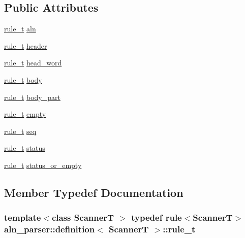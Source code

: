 \subsection*{Public Attributes}
\begin{DoxyCompactItemize}
\item 
\hyperlink{structaln__parser_1_1definition_a03794636bf4d0d047278756431378b21}{rule\+\_\+t} \hyperlink{structaln__parser_1_1definition_ab6919ea9346e2e607e34318f25211534}{aln}
\item 
\hyperlink{structaln__parser_1_1definition_a03794636bf4d0d047278756431378b21}{rule\+\_\+t} \hyperlink{structaln__parser_1_1definition_a7c56859f82c03b3f85d16095aea09f65}{header}
\item 
\hyperlink{structaln__parser_1_1definition_a03794636bf4d0d047278756431378b21}{rule\+\_\+t} \hyperlink{structaln__parser_1_1definition_a4ae49d8047c2156cbf75510ef5f3b434}{head\+\_\+word}
\item 
\hyperlink{structaln__parser_1_1definition_a03794636bf4d0d047278756431378b21}{rule\+\_\+t} \hyperlink{structaln__parser_1_1definition_ae6705116cb940909cda17ea3849c062f}{body}
\item 
\hyperlink{structaln__parser_1_1definition_a03794636bf4d0d047278756431378b21}{rule\+\_\+t} \hyperlink{structaln__parser_1_1definition_a64e55f65312e9ed84df5249ea54d45ea}{body\+\_\+part}
\item 
\hyperlink{structaln__parser_1_1definition_a03794636bf4d0d047278756431378b21}{rule\+\_\+t} \hyperlink{structaln__parser_1_1definition_afafdb23081539c09e9e4912b558d8332}{empty}
\item 
\hyperlink{structaln__parser_1_1definition_a03794636bf4d0d047278756431378b21}{rule\+\_\+t} \hyperlink{structaln__parser_1_1definition_a9f351b4a43adddc5d115367c48c9ec6c}{seq}
\item 
\hyperlink{structaln__parser_1_1definition_a03794636bf4d0d047278756431378b21}{rule\+\_\+t} \hyperlink{structaln__parser_1_1definition_a4209d9d63ba0c23bda9e14357d05c77a}{status}
\item 
\hyperlink{structaln__parser_1_1definition_a03794636bf4d0d047278756431378b21}{rule\+\_\+t} \hyperlink{structaln__parser_1_1definition_a9e5a7d05e2136f5f5870d98e5c732394}{status\+\_\+or\+\_\+empty}
\end{DoxyCompactItemize}


\subsection{Member Typedef Documentation}
\hypertarget{structaln__parser_1_1definition_a03794636bf4d0d047278756431378b21}{
\subsubsection[{rule\+\_\+t}]{\setlength{\rightskip}{0pt plus 5cm}template$<$class Scanner\+T $>$ typedef rule$<$Scanner\+T$>$ {\bf aln\+\_\+parser\+::definition}$<$ Scanner\+T $>$\+::{\bf rule\+\_\+t}}}\label{structaln__parser_1_1definition_a03794636bf4d0d047278756431378b21}


